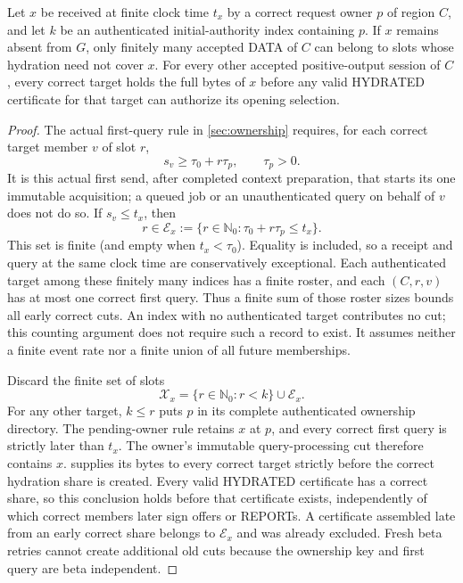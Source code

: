 \begin{proposition}
\label{prop:v310-finite-exceptions}
Let $x$ be received at finite clock time $t_x$ by a correct request
owner $p$ of region $C$, and let $k$ be an authenticated initial-authority
index containing $p$. If $x$ remains absent from $G$, only finitely many
accepted DATA of $C$ can belong to slots whose hydration need not cover
$x$. For every other accepted positive-output session of $C$, every
correct target holds the full bytes of $x$ before any valid HYDRATED
certificate for that target can authorize its opening selection.
\end{proposition}
\begin{proof}
The actual first-query rule in \cref{sec:ownership} requires, for each
correct target member $v$ of slot $r$,
\[
 s_v\ge\tau_0+r\tau_p,\qquad \tau_p>0.
\]
It is this actual first send, after completed context preparation, that
starts its one immutable acquisition; a queued job or an unauthenticated
query on behalf of $v$ does not do so. If $s_v\le t_x$, then
\[
 r\in\mathcal E_x
 :=\{r\in\mathbb N_0:\tau_0+r\tau_p\le t_x\}.
\]
This set is finite (and empty when $t_x<\tau_0$). Equality is included,
so a receipt and query at the same clock time are conservatively
exceptional. Each authenticated target among these finitely many
indices has a finite roster, and each $(C,r,v)$ has at most one correct
first query. Thus a finite sum of those roster sizes bounds all early
correct cuts. An index with no authenticated target contributes no cut;
this counting argument does not require such a record to exist. It
assumes neither a finite event rate nor a finite union of all future
memberships.

Discard the finite set of slots
\[
 \mathcal X_x=\{r\in\mathbb N_0:r<k\}\cup\mathcal E_x.
\]
For any other target, $k\le r$ puts $p$ in its complete authenticated
ownership directory. The pending-owner rule retains $x$ at $p$, and
every correct first query is strictly later than $t_x$. The owner's
immutable query-processing cut therefore contains $x$.
 supplies its bytes to every correct
target strictly before the correct hydration share is created. Every
valid HYDRATED certificate has a correct share, so this conclusion
holds before that certificate exists, independently of which correct
members later sign offers or REPORTs. A certificate assembled late from
an early correct share belongs to $\mathcal E_x$ and was already
excluded. Fresh beta retries cannot create additional old cuts because
the ownership key and first query are beta independent.


\end{proof}
